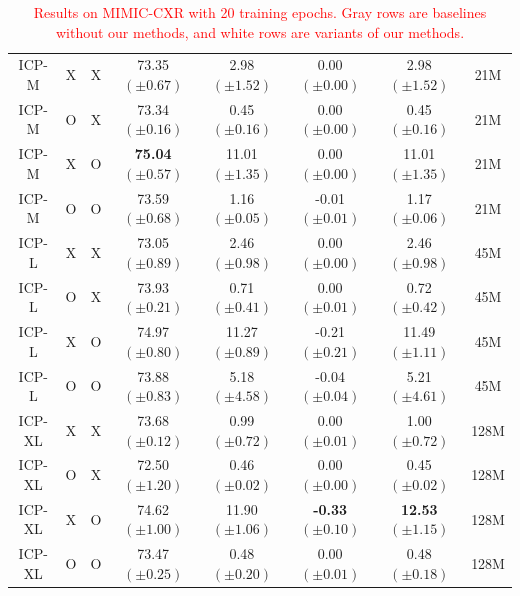 \documentclass[preprint,7pt, a4paper]{elsarticle}
\begin{document}
\begin{table}
{{\begin{tabular}{c|cc|c|ccc|c}
        \midrule
        ICP-M & X & X & 73.35 $(\pm0.67)$ & 2.98 $(\pm1.52)$ & 0.00 $(\pm0.00)$ & 2.98 $(\pm1.52)$ & 21M\\
        ICP-M & O & X & 73.34 $(\pm0.16)$ & 0.45 $(\pm0.16)$ & 0.00 $(\pm0.00)$ & 0.45 $(\pm0.16)$ & 21M\\
        \rowcolor{LemonChiffon1}
        ICP-M & X & O & \textbf{75.04} $\bm{(\pm0.57)}$ & 11.01 $(\pm1.35)$ & 0.00 $(\pm0.00)$ & 11.01 $(\pm1.35)$ & 21M\\
        ICP-M & O & O & 73.59 $(\pm0.68)$ & 1.16 $(\pm0.05)$ & -0.01 $(\pm0.01)$ & 1.17 $(\pm0.06)$ & 21M\\
        \midrule
        ICP-L & X & X & 73.05 $(\pm0.89)$ & 2.46 $(\pm0.98)$ & 0.00 $(\pm0.00)$ & 2.46 $(\pm0.98)$ & 45M\\
        ICP-L & O & X & 73.93 $(\pm0.21)$ & 0.71 $(\pm0.41)$ & 0.00 $(\pm0.01)$ & 0.72 $(\pm0.42)$ & 45M\\
        ICP-L & X & O & 74.97 $(\pm0.80)$ & 11.27 $(\pm0.89)$ & -0.21 $(\pm0.21)$ & 11.49 $(\pm1.11)$ & 45M\\
        ICP-L & O & O & 73.88 $(\pm0.83)$ & 5.18 $(\pm4.58)$ & -0.04 $(\pm0.04)$ & 5.21 $(\pm4.61)$ & 45M\\
        \midrule
        ICP-XL & X & X & 73.68 $(\pm0.12)$ & 0.99 $(\pm0.72)$ & 0.00 $(\pm0.01)$ & 1.00 $(\pm0.72)$ & 128M\\
        ICP-XL & O & X & 72.50 $(\pm1.20)$ & 0.46 $(\pm0.02)$ & 0.00 $(\pm0.00)$ & 0.45 $(\pm0.02)$ & 128M\\
        ICP-XL & X & O& 74.62 $(\pm1.00)$ & 11.90 $(\pm1.06)$ & \textbf{-0.33} $\bm{(\pm0.10)}$ & \textbf{12.53} $\bm{(\pm1.15)}$ & 128M\\
        ICP-XL & O & O & 73.47 $(\pm0.25)$ & 0.48 $(\pm0.20)$ & 0.00 $(\pm0.01)$ & 0.48 $(\pm0.18)$ & 128M\\
        \bottomrule
    \end{tabular}
    }}
    \caption{\textcolor{red}{Results on MIMIC-CXR with 20 training epochs. Gray rows are baselines without our methods, and white rows are variants of our methods.}}
    \label{mimic1}
\end{table}
\end{document}
